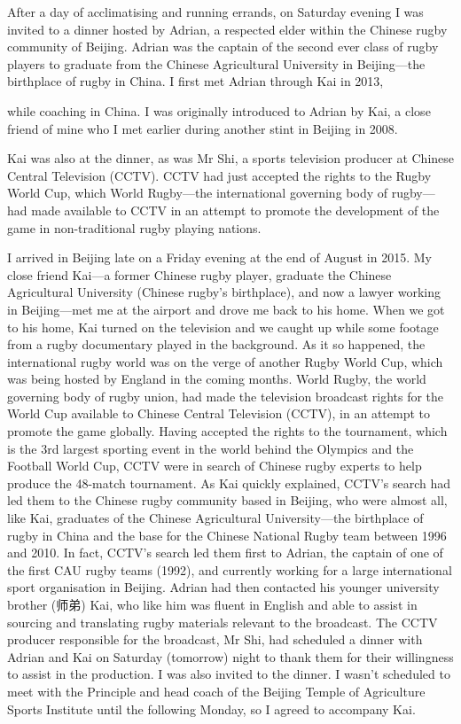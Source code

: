 After a day of acclimatising and running errands, on Saturday evening I was invited to a dinner hosted by Adrian, a respected elder within the Chinese rugby community of Beijing.  Adrian was the captain of the second ever class of rugby players to graduate from the Chinese Agricultural University in Beijing---the birthplace of rugby in China.
I first met Adrian through Kai in 2013,

 while coaching in China.  I was originally introduced to Adrian by Kai, a close friend of mine who I met earlier during another stint in Beijing in 2008.

 Kai was also at the dinner, as was Mr Shi, a sports television producer at Chinese Central Television (CCTV).  CCTV had just accepted the rights to the Rugby World Cup, which World Rugby---the international governing body of rugby---had made available to CCTV in an attempt to promote the development of the game in non-traditional rugby playing nations.


I arrived in Beijing late on a Friday evening at the end of August in 2015.  My close friend Kai---a former Chinese rugby player, graduate the Chinese Agricultural University (Chinese rugby's birthplace), and now a lawyer working in Beijing---met me at the airport and drove me back to his home.  When we got to his home, Kai turned on the television and we caught up while some footage from a rugby documentary played in the background.  As it so happened, the international rugby world was on the verge of another Rugby World Cup, which was being hosted by England in the coming months. World Rugby, the world governing body of rugby union, had made the television broadcast rights for the World Cup available to Chinese Central Television (CCTV), in an attempt to promote the game globally.  Having accepted the rights to the tournament, which is the 3rd largest sporting event in the world behind the Olympics and the Football World Cup, CCTV were in search of Chinese rugby experts to help produce the 48-match tournament.  As Kai quickly explained, CCTV's search had led them to the Chinese rugby community based in Beijing, who were almost all, like Kai, graduates of the Chinese Agricultural University---the birthplace of rugby in China and the base for the Chinese National Rugby team between 1996 and 2010.  In fact, CCTV's search led them first to Adrian, the captain of one of the first CAU rugby teams (1992), and currently working for a large international sport organisation in Beijing.  Adrian had then contacted his younger university brother (师弟) Kai, who like him was fluent in English and able to assist in sourcing and translating rugby materials relevant to the broadcast. The CCTV producer responsible for the broadcast, Mr Shi, had scheduled a dinner with Adrian and Kai on Saturday (tomorrow) night to thank them for their willingness to assist in the production.  I was also invited to the dinner. I wasn't scheduled to meet with the Principle and head coach of the Beijing Temple of Agriculture Sports Institute until the following Monday, so I agreed to accompany Kai.
